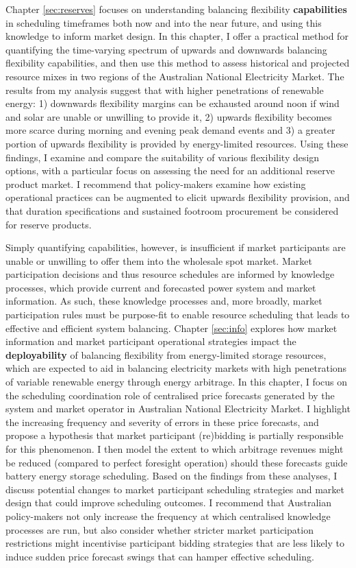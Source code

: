 \documentclass[12pt,a4paper,]{report}
\begin{document}
Chapter \ref{sec:reserves} focuses on understanding balancing
flexibility \textbf{capabilities} in scheduling timeframes both now and
into the near future, and using this knowledge to inform market design.
In this chapter, I offer a practical method for quantifying the
time-varying spectrum of upwards and downwards balancing flexibility
capabilities, and then use this method to assess historical and
projected resource mixes in two regions of the Australian National
Electricity Market. The results from my analysis suggest that with
higher penetrations of renewable energy: 1) downwards flexibility
margins can be exhausted around noon if wind and solar are unable or
unwilling to provide it, 2) upwards flexibility becomes more scarce
during morning and evening peak demand events and 3) a greater portion
of upwards flexibility is provided by energy-limited resources. Using
these findings, I examine and compare the suitability of various
flexibility design options, with a particular focus on assessing the
need for an additional reserve product market. I recommend that
policy-makers examine how existing operational practices can be
augmented to elicit upwards flexibility provision, and that duration
specifications and sustained footroom procurement be considered for
reserve products.

Simply quantifying capabilities, however, is insufficient if market
participants are unable or unwilling to offer them into the wholesale
spot market. Market participation decisions and thus resource schedules
are informed by knowledge processes, which provide current and
forecasted power system and market information. As such, these knowledge
processes and, more broadly, market participation rules must be
purpose-fit to enable resource scheduling that leads to effective and
efficient system balancing. Chapter \ref{sec:info} explores how market
information and market participant operational strategies impact the
\textbf{deployability} of balancing flexibility from energy-limited
storage resources, which are expected to aid in balancing electricity
markets with high penetrations of variable renewable energy through
energy arbitrage. In this chapter, I focus on the scheduling
coordination role of centralised price forecasts generated by the system
and market operator in Australian National Electricity Market. I
highlight the increasing frequency and severity of errors in these price
forecasts, and propose a hypothesis that market participant (re)bidding
is partially responsible for this phenomenon. I then model the extent to
which arbitrage revenues might be reduced (compared to perfect foresight
operation) should these forecasts guide battery energy storage
scheduling. Based on the findings from these analyses, I discuss
potential changes to market participant scheduling strategies and market
design that could improve scheduling outcomes. I recommend that
Australian policy-makers not only increase the frequency at which
centralised knowledge processes are run, but also consider whether
stricter market participation restrictions might incentivise participant
bidding strategies that are less likely to induce sudden price forecast
swings that can hamper effective scheduling.
\end{document}
